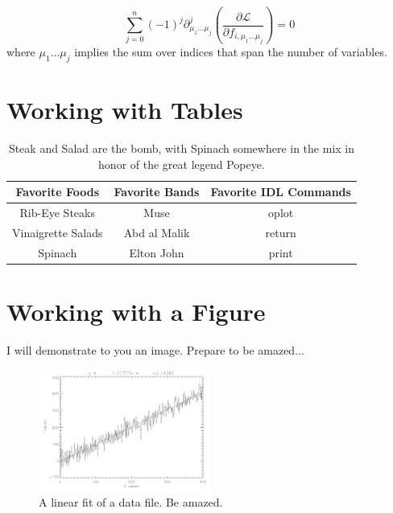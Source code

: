 \documentclass[12pt]{article}
\begin{document}
\[
\sum_{j=0}^n (-1)^j \partial_{ \mu_{1}\ldots\mu_{j} }^j\left(\frac{
    \partial \mathcal{L} }{\partial f_{i, \mu_1 \dots \mu_{j} } }\right
  ) = 0 
\]
where $\mu_{1}\ldots \mu_{j}$ implies the sum over indices that span the
number of variables.

\section{Working with Tables}

\begin{table}[h!]
  \centering
  \begin{tabular}{ c | c | c }
    \hline
    Favorite Foods & Favorite Bands & Favorite IDL Commands \\ \hline
    Rib-Eye Steaks & Muse & oplot \\
    Vinaigrette Salads & Abd al Malik & return \\
    Spinach & Elton John & print \\ \hline
  \end{tabular}
  \caption{ Steak and Salad are the bomb, with Spinach somewhere in the mix in honor of the great legend Popeye. }
\end{table}

\section{Working with a Figure}
I will demonstrate to you an image. Prepare to be amazed...
\begin{figure}[H]
  \centering
  \includegraphics[width=0.5\textwidth]{tut6.pdf}
  \caption{A linear fit of a data file. Be amazed.}
\end{figure}
\end{document}
